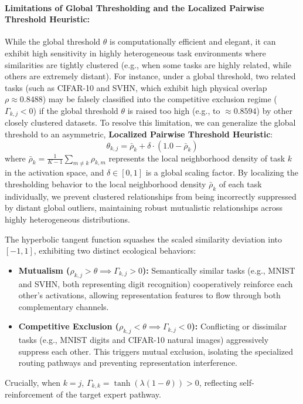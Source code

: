 \paragraph{Limitations of Global Thresholding and the Localized Pairwise Threshold Heuristic:}
While the global threshold $\theta$ is computationally efficient and elegant, it can exhibit high sensitivity in highly heterogeneous task environments where similarities are tightly clustered (e.g., when some tasks are highly related, while others are extremely distant). For instance, under a global threshold, two related tasks (such as CIFAR-10 and SVHN, which exhibit high physical overlap $\rho \approx 0.8488$) may be falsely classified into the competitive exclusion regime ($\Gamma_{k, j} < 0$) if the global threshold $\theta$ is raised too high (e.g., to $\approx 0.8594$) by other closely clustered datasets. To resolve this limitation, we can generalize the global threshold to an asymmetric, \textbf{Localized Pairwise Threshold Heuristic}:
\begin{equation}
    \theta_{k, j} = \bar{\rho}_{k} + \delta \cdot \left( 1.0 - \bar{\rho}_{k} \right)
\end{equation}
where $\bar{\rho}_{k} = \frac{1}{K-1} \sum_{m \neq k} \rho_{k, m}$ represents the local neighborhood density of task $k$ in the activation space, and $\delta \in [0, 1]$ is a global scaling factor. By localizing the thresholding behavior to the local neighborhood density $\bar{\rho}_{k}$ of each task individually, we prevent clustered relationships from being incorrectly suppressed by distant global outliers, maintaining robust mutualistic relationships across highly heterogeneous distributions.

The hyperbolic tangent function squashes the scaled similarity deviation into $[-1, 1]$, exhibiting two distinct ecological behaviors:
\begin{itemize}
    \item \textbf{Mutualism ($\rho_{k, j} > \theta \implies \Gamma_{k, j} > 0$):} Semantically similar tasks (e.g., MNIST and SVHN, both representing digit recognition) cooperatively reinforce each other's activations, allowing representation features to flow through both complementary channels.
    \item \textbf{Competitive Exclusion ($\rho_{k, j} < \theta \implies \Gamma_{k, j} < 0$):} Conflicting or dissimilar tasks (e.g., MNIST digits and CIFAR-10 natural images) aggressively suppress each other. This triggers mutual exclusion, isolating the specialized routing pathways and preventing representation interference.
\end{itemize}
Crucially, when $k=j$, $\Gamma_{k, k} = \tanh(\lambda(1-\theta)) > 0$, reflecting self-reinforcement of the target expert pathway.

